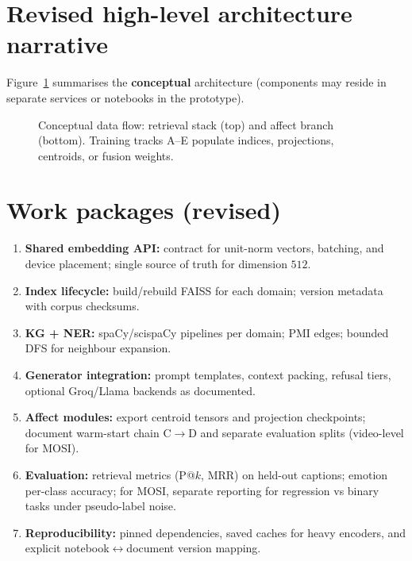 \documentclass[12pt,a4paper]{article}
\begin{document}
\section{Revised high-level architecture narrative}

Figure~\ref{fig:concept} summarises the \textbf{conceptual} architecture (components
may reside in separate services or notebooks in the prototype).

\begin{figure}[htbp]
\centering
{}
\caption{Conceptual data flow: retrieval stack (top) and affect branch (bottom).
Training tracks A--E populate indices, projections, centroids, or fusion weights.}
\label{fig:concept}
\end{figure}

\section{Work packages (revised)}

\begin{enumerate}
  \item \textbf{Shared embedding API:} contract for unit-norm vectors, batching, and
        device placement; single source of truth for dimension $512$.
  \item \textbf{Index lifecycle:} build/rebuild FAISS for each domain; version metadata
        with corpus checksums.
  \item \textbf{KG + NER:} spaCy/scispaCy pipelines per domain; PMI edges; bounded DFS
        for neighbour expansion.
  \item \textbf{Generator integration:} prompt templates, context packing, refusal
        tiers, optional Groq/Llama backends as documented.
  \item \textbf{Affect modules:} export centroid tensors and projection checkpoints;
        document warm-start chain C$\to$D and separate evaluation splits (video-level
        for MOSI).
  \item \textbf{Evaluation:} retrieval metrics (P@$k$, MRR) on held-out captions;
        emotion per-class accuracy; for MOSI, separate reporting for regression vs
        binary tasks under pseudo-label noise.
  \item \textbf{Reproducibility:} pinned dependencies, saved caches for heavy
        encoders, and explicit notebook$\leftrightarrow$document version mapping.
\end{enumerate}
\end{document}
